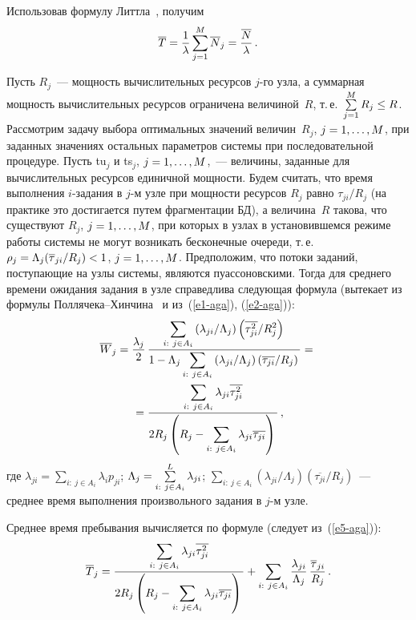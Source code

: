 \begin{multicols}{2}
Использовав формулу Литтла~\cite{11-aga}, получим
\begin{equation}
\overline{T} =\displaystyle\frac{\displaystyle 1\mathstrut}{\displaystyle \lambda\mathstrut} \sum\limits^M_{j=1} \overline{N}_j
=\displaystyle\frac{\displaystyle \overline{N}\mathstrut}{\displaystyle \lambda\mathstrut}\,.
\label{e4-aga}
\end{equation}

Пусть $R_j$~--- мощность вычислительных ресурсов $j$-го узла, а суммарная
мощность вычислительных ресурсов ограничена величиной~$R$, т.\,е.\
$\sum\limits_{j=1}^M R_j\hm\leq R$. Рассмотрим задачу выбора оптимальных
значений величин~$R_j$, $j\hm= 1, \ldots , M$, при заданных значениях
остальных параметров системы при последовательной процедуре. Пусть tu$_j$ и
ts$_j$, $j\hm= 1,\ldots , M$,~--- величины, заданные для вычислительных ресурсов
единичной мощности. Будем считать, что время выполнения $i$-за\-да\-ния в
$j$-м узле при мощности ресурсов $R_j$ равно $\tau_{ji}/R_j$ (на практике это
достигается путем фрагментации БД), а величина~$R$ такова, что
существуют $R_j$, $j\hm= 1, \ldots , M$, при которых в узлах в установившемся
режиме работы системы не могут возникать бесконечные очереди, т.\,е.\ $\rho_j
= \Lambda_j (\overline{\tau}_{ji}/R_j) \hm <1$, $j\hm= 1, \ldots , M$.
Предположим, что потоки заданий, поступающие на узлы системы, являются
пуассоновскими. Тогда для среднего времени ожидания задания в узле
справедлива следующая формула (вытекает из формулы
Пол\-ля\-че\-ка--Хин\-чи\-на~\cite{11-aga} и из~(\ref{e1-aga}), (\ref{e2-aga})):
\begin{multline}
\overline{W}_j = \displaystyle\frac{\displaystyle \lambda_j\mathstrut}{\displaystyle 2\mathstrut}\,\displaystyle\frac{\displaystyle \sum\limits_{i:\ j\in A_i}
\left(\lambda_{ji}/\Lambda_j\right) \left(\overline{\tau^2_{ji}}/R^2_j\right)\mathstrut}{\displaystyle 1-\Lambda_j
\sum\limits_{i:\ j\in A_i}\left(\lambda_{ji}/\Lambda_j\right)
\left(\overline{\tau_{ji}}/R_j\right)\mathstrut}={}\\
{}=
\displaystyle\frac{\displaystyle \sum\limits_{i:\ j\in A_i} \lambda_{ji} \overline{\tau^2_{ji}}\mathstrut}{\displaystyle 2R_j\left( R_j -
\sum\limits_{i:\ j\in A_i} \lambda_{ji} \overline{\tau_{ji}}\right)\mathstrut}\,,
\label{e5-aga}
\end{multline}
где $\lambda_{ji} = \sum\limits_{i:\ j\in A_i} \lambda_i p_{ji}$; $\Lambda_j\hm=
\sum\limits^L_{i:\ j\in A_i} \lambda_{ji}$; $\sum\limits_{i:\ j\in A_i}
(\lambda_{ji}/\Lambda_j)(\overline{\tau_{ji}}/R_j)$~--- среднее время
выполнения произвольного задания в $j$-м узле.

Среднее время пребывания вычисляется по формуле (следует из~(\ref{e5-aga})):
\begin{equation}
\overline{T}_j = \displaystyle\frac{\displaystyle \sum\limits_{i:\ j\in A_i} \lambda_{ji}
\overline{\tau^2_{ji}}\mathstrut}{\displaystyle 2R_j \left(R_j-
\sum\limits_{i:\ j\in A_i} \lambda_{ji} \overline{\tau_{ji}}\right)\mathstrut}+\sum\limits_{i:\ j\in A_i}
\displaystyle\frac{\displaystyle \lambda_{ji}\mathstrut}{\displaystyle \Lambda_j\mathstrut}\,\displaystyle\frac{\displaystyle \overline{\tau}_{ji}\mathstrut}{\displaystyle R_j\mathstrut}\,.
\label{e6-aga}
\end{equation}


\end{multicols}
